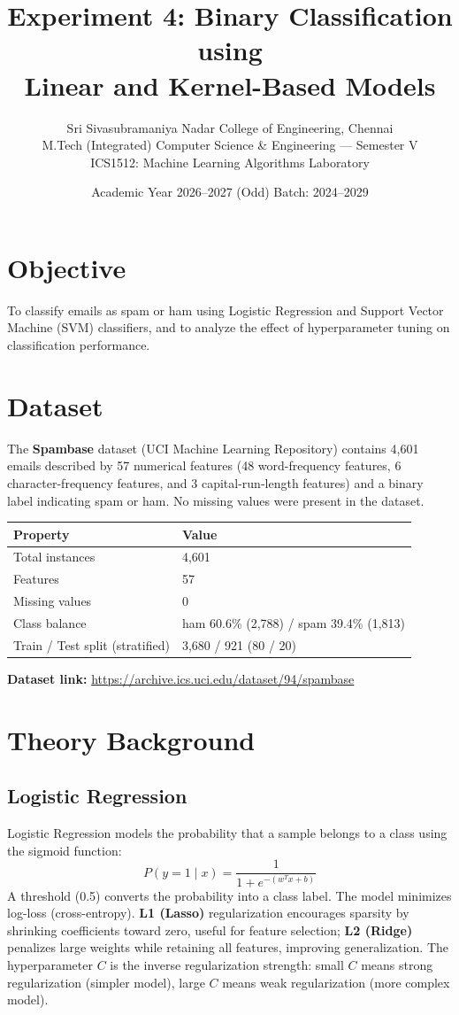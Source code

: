 \documentclass[11pt]{article}
\title{\textbf{Experiment 4: Binary Classification using \\ Linear and Kernel-Based Models}}
\author{Sri Sivasubramaniya Nadar College of Engineering, Chennai \\
M.Tech (Integrated) Computer Science \& Engineering --- Semester V \\
ICS1512: Machine Learning Algorithms Laboratory}
\date{Academic Year 2026--2027 (Odd) \quad Batch: 2024--2029}
\begin{document}
\maketitle

\section*{Objective}
To classify emails as spam or ham using Logistic Regression and Support Vector Machine (SVM) classifiers, and to analyze the effect of hyperparameter tuning on classification performance.

\section*{Dataset}
The \textbf{Spambase} dataset (UCI Machine Learning Repository) contains 4{,}601 emails described by 57 numerical features (48 word-frequency features, 6 character-frequency features, and 3 capital-run-length features) and a binary label indicating spam or ham. No missing values were present in the dataset.

\begin{center}
\begin{tabular}{ll}
\toprule
\textbf{Property} & \textbf{Value} \\
\midrule
Total instances & 4{,}601 \\
Features & 57 \\
Missing values & 0 \\
Class balance & ham 60.6\% (2{,}788) / spam 39.4\% (1{,}813) \\
Train / Test split (stratified) & 3{,}680 / 921 (80 / 20) \\
\bottomrule
\end{tabular}
\end{center}

\noindent \textbf{Dataset link:} \url{https://archive.ics.uci.edu/dataset/94/spambase}

\section{Theory Background}

\subsection{Logistic Regression}
Logistic Regression models the probability that a sample belongs to a class using the sigmoid function:
\[
P(y=1 \mid x) = \frac{1}{1 + e^{-(w^Tx + b)}}
\]
A threshold (0.5) converts the probability into a class label. The model minimizes log-loss (cross-entropy). \textbf{L1 (Lasso)} regularization encourages sparsity by shrinking coefficients toward zero, useful for feature selection; \textbf{L2 (Ridge)} penalizes large weights while retaining all features, improving generalization. The hyperparameter $C$ is the inverse regularization strength: small $C$ means strong regularization (simpler model), large $C$ means weak regularization (more complex model).
\end{document}
